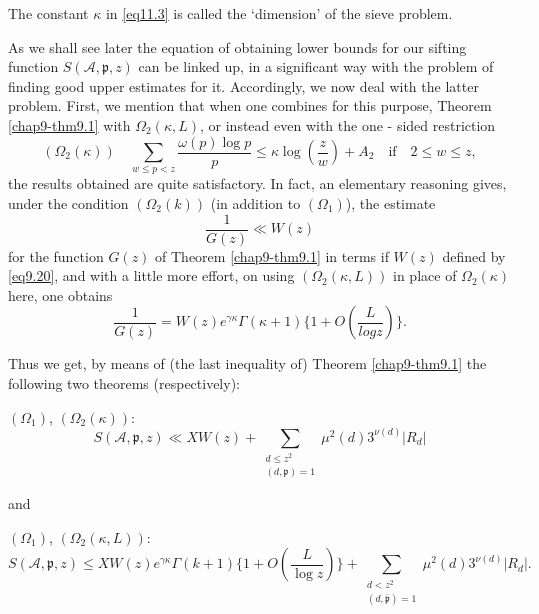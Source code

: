 The constant $\kappa$ in \eqref{eq11.3} is called the `dimension' of
the sieve problem. 

As we shall see later the equation of obtaining lower bounds for our
sifting function $S(\mathscr{A},\mathfrak{p},z)$ can be linked up, in
a significant way with the problem of finding good upper estimates for
it. Accordingly, we now deal with the latter problem. First, we
mention that when one combines for this purpose, Theorem
\ref{chap9-thm9.1} with $\Omega_2 (\kappa,L)$, or instead even with the one
- sided restriction   
\begin{equation*}
(\Omega_2 (\kappa)) \quad \sum_{w \le p < z}  \frac{\omega(p) \log p}{p}
  \le \kappa \log (\frac{z}{w}) + A_2 \quad\text{if}\quad 
2 \le w \le z,\tag{11.4} \label{eq11.4}
\end{equation*}
the results obtained are quite satisfactory. In fact, an elementary
reasoning gives, under the condition $(\Omega_2(k))$ (in addition to
$(\Omega_1)$), the estimate 
\begin{equation*}
\frac{1}{G(z)}\ll W (z)\tag{11.5}\label{eq11.5}
\end{equation*}
for the function $G(z)$ of Theorem \ref{chap9-thm9.1} in terms if
$W(z)$ defined by \eqref{eq9.20}, and with a little more effort, on
using $(\Omega_2(\kappa,L))$ in place of $\Omega_2(\kappa)$ here, one obtains  
\begin{equation*}
\frac{1}{G(z)} = W(z) e^{\gamma \kappa} \Gamma (\kappa + 1) \big \{ 1+ O
(\frac{L}{log z}) \big \}.\tag{11.6}\label{eq11.6} 
\end{equation*}

Thus we get, by means of (the last inequality of) Theorem
\ref{chap9-thm9.1} the following two theorems (respectively): 

\setcounter{section}{11}
\setcounter{theorem}{0}
\begin{theorem}\label{chap11-thm11.1}%
$(\Omega_1)$, $(\Omega_2 (\kappa)):$
\begin{equation*}
S(\mathscr{A},\mathfrak{p}, z) \ll X W (z) + \sum_{\substack{d \leq z^2
    \\ (d, \mathfrak{p}) = 1}} \mu^2 (d) 3^{\nu (d)} | R_d
|\tag{11.7}\label{eq11.7}  
\end{equation*}
\end{theorem}
and\pageoriginale
\begin{theorem}\label{chap11-thm11.2}%
$(\Omega_1)$, $(\Omega_2 (\kappa, L)):$
\begin{equation*}
S(\mathscr{A}, \mathfrak{p}, z) \le X W (z)e^{\gamma \kappa} \Gamma (k+1)
\big \{ 1+O (\frac{L}{\log z}) \big \}  + \sum_{\substack{d < z^2
    \\ (d, \bar{\mathfrak{p}}) = 1}} \mu^2 (d) 3^{\nu (d)}| R_d
|.\tag{11.8} \label{eq11.8}
\end{equation*}
\end{theorem}

